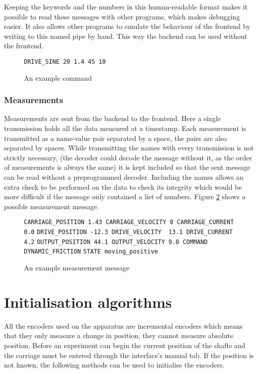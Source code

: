 \documentclass[12pt]{article}
\begin{document}
Keeping the keywords and the numbers in this human-readable format makes it possible to read these messages with other programs, which makes debugging easier. It also allows other programs to emulate the behaviour of the frontend by writing to this named pipe by hand. This way the backend can be used without the frontend. 

\begin{figure}[h]
    \centering
    \verb|DRIVE_SINE 20 1.4 45 10|
    \caption{An example command}
    \label{fig:commandMessage}
\end{figure}


\subsubsection{Measurements}
\label{sec:measurements}
Measurements are sent from the backend to the frontend. Here a single transmission holds all the data measured at a timestamp. Each measurement is transmitted as a name-value pair separated by a space, the pairs are also separated by spaces. While transmitting the names with every transmission is not strictly necessary, (the decoder could decode the message without it, as the order of measurements is always the same) it is kept included so that the sent message can be read without a preprogrammed decoder. Including the names allows an extra check to be performed on the data to check its integrity which would be more difficult if the message only contained a list of numbers. Figure \ref{fig:measurementMessage} shows a possible measurement message.

\begin{figure}[h]

    \verb|CARRIAGE_POSITION 1.43 CARRIAGE_VELOCITY 0 CARRIAGE_CURRENT 0.0|
    \verb|DRIVE_POSITION -12.3 DRIVE_VELOCITY  13.1 DRIVE_CURRENT 4.2|
    \verb|OUTPUT_POSITION 44.1 OUTPUT_VELOCITY 9.0 COMMAND DYNAMIC_FRICTION|
    \verb|STATE moving_positive|
    \caption{An example measurement message}
    \label{fig:measurementMessage}
\end{figure}

\clearpage
\section{Initialisation algorithms}
\label{sec:initialisation}
All the encoders used on the apparatus are incremental encoders which means that they only measure a change in position, they cannot measure absolute position. Before an experiment can begin the current position of the shafts and the carriage must be entered through the interface's manual tab. If the position is not known, the following methods can be used to initialise the encoders.
\end{document}
